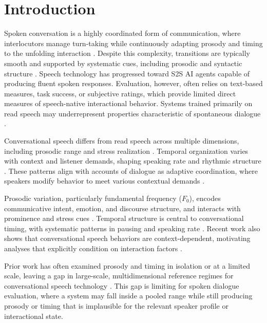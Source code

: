 \documentclass[conference]{IEEEtran}
\begin{document}
\section{Introduction}

Spoken conversation is a highly coordinated form of communication, where interlocutors manage turn-taking while continuously adapting prosody and timing to the unfolding interaction \cite{riest_anticipation_2015, levinson_turn-taking_2016}. 
Despite this complexity, transitions are typically smooth and supported by systematic cues, including prosodic and syntactic structure \cite{koiso_analysis_1998}.
Speech technology has progressed toward S2S AI agents capable of producing fluent spoken responses. 
Evaluation, however, often relies on text-based measures, task success, or subjective ratings, which provide limited direct measures of speech-native interactional behavior. 
Systems trained primarily on read speech may underrepresent properties characteristic of spontaneous dialogue \cite{omahony_combining_2022}.

Conversational speech differs from read speech across multiple dimensions, including prosodic range and stress realization \cite{howell1991comparison, hazan2010does}. 
Temporal organization varies with context and listener demands, shaping speaking rate and rhythmic structure \cite{tauroza_speech_1990, ward_automatic_2004, dowding_user_2024, xie_speaking_2024}. 
These patterns align with accounts of dialogue as adaptive coordination, where speakers modify behavior to meet various contextual demands \cite{fusaroli_dialog_2014, wynn_conversational_2024}.

Prosodic variation, particularly fundamental frequency ($F_0$), encodes communicative intent, emotion, and discourse structure, and interacts with prominence and stress cues \cite{banziger_role_2005, pell_emotional_2011, xu_speech_2005, sluijter_acoustic_1996, sluijter_spectral_1996}. 
Temporal structure is central to conversational timing, with systematic patterns in pausing and speaking rate \cite{goldman1958speech, pellegrino_automatic_2004, pellegrino_across-language_2011, jiao_estimating_2015, morgan_combining_1998, nanjo_language_2004}. 
Recent work also shows that conversational speech behaviors are context-dependent, motivating analyses that explicitly condition on interaction factors \cite{wynn_conversational_2024}.

Prior work has often examined prosody and timing in isolation or at a limited scale, leaving a gap in large-scale, multidimensional reference regimes for conversational speech technology \cite{traunmuller_acoustic_2000}. 
This gap is limiting for spoken dialogue evaluation, where a system may fall inside a pooled range while still producing prosody or timing that is implausible for the relevant speaker profile or interactional state.
\end{document}
